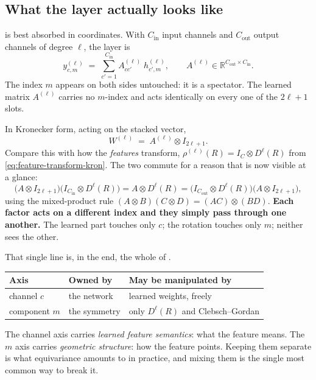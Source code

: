 \documentclass[11pt,a4paper]{report}
\theoremstyle{definition}
\theoremstyle{remark}
\newcommand{\RR}{\mathbb R}
\begin{document}
\subsection{What the layer actually looks like}
\label{sec:linear-layer-form}

 is best absorbed in coordinates. With
$C_{\mathrm{in}}$ input channels and $C_{\mathrm{out}}$ output channels of
degree $\ell$, the layer is
\begin{equation}
\label{eq:equivariant-linear-coords}
y^{(\ell)}_{c,m} \;=\; \sum_{c'=1}^{C_{\mathrm{in}}} A^{(\ell)}_{cc'}\;h^{(\ell)}_{c',m},
\qquad
A^{(\ell)}\in\RR^{C_{\mathrm{out}}\times C_{\mathrm{in}}} .
\end{equation}
The index $m$ appears on both sides untouched: it is a spectator. The
learned matrix $A^{(\ell)}$ carries no $m$-index and acts identically on
every one of the $2\ell+1$ slots.

In Kronecker form, acting on the stacked vector,
\begin{equation}
\label{eq:equivariant-linear-kron}
W^{(\ell)} \;=\; A^{(\ell)}\otimes I_{2\ell+1} .
\end{equation}
Compare this with how the \emph{features} transform,
$\rho^{(\ell)}(R)=I_{C}\otimes D^\ell(R)$ from
\eqref{eq:feature-transform-kron}. The two commute for a reason that is now
visible at a glance:
\[
\bigl(A\otimes I_{2\ell+1}\bigr)\bigl(I_{C_{\mathrm{in}}}\otimes D^\ell(R)\bigr)
= A\otimes D^\ell(R)
= \bigl(I_{C_{\mathrm{out}}}\otimes D^\ell(R)\bigr)\bigl(A\otimes I_{2\ell+1}\bigr),
\]
using the mixed-product rule $(A\otimes B)(C\otimes D)=(AC)\otimes(BD)$.
\textbf{Each factor acts on a different index and they simply pass through
one another.} The learned part touches only $c$; the rotation touches only
$m$; neither sees the other.

That single line is, in the end, the whole of .

\begin{tcolorbox}[colback=green!3,colframe=green!35!black,title={Two axes, two owners}]
\begin{center}
\begin{tabular}{lll}
\toprule
Axis & Owned by & May be manipulated by \\
\midrule
channel $c$ & the network & learned weights, freely \\
component $m$ & the symmetry & only $D^\ell(R)$ and Clebsch--Gordan \\
\bottomrule
\end{tabular}
\end{center}
The channel axis carries \emph{learned feature semantics}: what the feature
means. The $m$ axis carries \emph{geometric structure}: how the feature
points. Keeping them separate is what equivariance amounts to in practice,
and mixing them is the single most common way to break it.
\end{tcolorbox}
\end{document}
